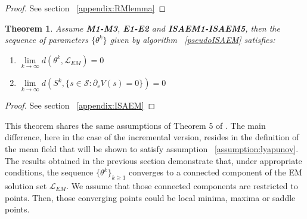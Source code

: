 \documentclass[a4paper]{article}
\theoremstyle{plain}
\theoremstyle{plain}
\newtheorem{thm}{Theorem}
\theoremstyle{definition}
\begin{document}
\begin{proof}
See section ~\ref{appendix:RMlemma}
\end{proof}
\begin{thm}\label{theorem_isaem}
Assume {\normalfont \textbf{M1-M3}}, {\normalfont \textbf{E1-E2}} and {\normalfont \textbf{ISAEM1-ISAEM5}}, then the sequence of parameters $\{\theta^k\}$ given by algorithm ~\ref{pseudoISAEM} satisfies:
\begin{enumerate}
\item $\lim \limits_{k \to \infty} d(\theta^k, \mathcal{L}_{EM}) = 0 $
\item $\lim \limits_{k \to \infty} d(S^k, \{s \in \mathcal{S}: \partial_s V(s) = 0\}) = 0 $ 
\end{enumerate}
\end{thm}
\begin{proof}
See section ~\ref{appendix:ISAEM}
\end{proof}
This theorem shares the same assumptions of Theorem 5 of \citep{lavielle}. The main difference, here in the case of the incremental version, resides in the definition of the mean field that will be shown to satisfy assumption ~\ref{assumption:lyapunov}.\\
The results obtained in the previous section demonstrate that, under appropriate conditions, the sequence $\{\theta^k\}_{k \geq 1}$ converges to a connected component of the EM solution set $\mathcal{L}_{EM}$. We assume that those connected components are restricted to points. Then, those converging points could be local minima, maxima or saddle points.

\clearpage
\end{document}
